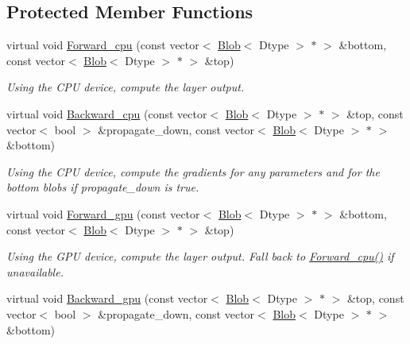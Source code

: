 \subsection*{Protected Member Functions}
\begin{DoxyCompactItemize}
\item 
virtual void \hyperlink{classcaffe_1_1CropLayer_ac04c0c520795b4879018755d26acf7aa}{Forward\+\_\+cpu} (const vector$<$ \hyperlink{classcaffe_1_1Blob}{Blob}$<$ Dtype $>$ $\ast$ $>$ \&bottom, const vector$<$ \hyperlink{classcaffe_1_1Blob}{Blob}$<$ Dtype $>$ $\ast$ $>$ \&top)\hypertarget{classcaffe_1_1CropLayer_ac04c0c520795b4879018755d26acf7aa}{}\label{classcaffe_1_1CropLayer_ac04c0c520795b4879018755d26acf7aa}

\begin{DoxyCompactList}\small\item\em Using the C\+PU device, compute the layer output. \end{DoxyCompactList}\item 
virtual void \hyperlink{classcaffe_1_1CropLayer_abf342bcb5e278303fd0c8e90016c2df2}{Backward\+\_\+cpu} (const vector$<$ \hyperlink{classcaffe_1_1Blob}{Blob}$<$ Dtype $>$ $\ast$ $>$ \&top, const vector$<$ bool $>$ \&propagate\+\_\+down, const vector$<$ \hyperlink{classcaffe_1_1Blob}{Blob}$<$ Dtype $>$ $\ast$ $>$ \&bottom)\hypertarget{classcaffe_1_1CropLayer_abf342bcb5e278303fd0c8e90016c2df2}{}\label{classcaffe_1_1CropLayer_abf342bcb5e278303fd0c8e90016c2df2}

\begin{DoxyCompactList}\small\item\em Using the C\+PU device, compute the gradients for any parameters and for the bottom blobs if propagate\+\_\+down is true. \end{DoxyCompactList}\item 
virtual void \hyperlink{classcaffe_1_1CropLayer_a6eff85d2be46fa1701a17a26c1e54dfb}{Forward\+\_\+gpu} (const vector$<$ \hyperlink{classcaffe_1_1Blob}{Blob}$<$ Dtype $>$ $\ast$ $>$ \&bottom, const vector$<$ \hyperlink{classcaffe_1_1Blob}{Blob}$<$ Dtype $>$ $\ast$ $>$ \&top)\hypertarget{classcaffe_1_1CropLayer_a6eff85d2be46fa1701a17a26c1e54dfb}{}\label{classcaffe_1_1CropLayer_a6eff85d2be46fa1701a17a26c1e54dfb}

\begin{DoxyCompactList}\small\item\em Using the G\+PU device, compute the layer output. Fall back to \hyperlink{classcaffe_1_1CropLayer_ac04c0c520795b4879018755d26acf7aa}{Forward\+\_\+cpu()} if unavailable. \end{DoxyCompactList}\item 
virtual void \hyperlink{classcaffe_1_1CropLayer_a3a7f52f728093a219e2784d9c15be41d}{Backward\+\_\+gpu} (const vector$<$ \hyperlink{classcaffe_1_1Blob}{Blob}$<$ Dtype $>$ $\ast$ $>$ \&top, const vector$<$ bool $>$ \&propagate\+\_\+down, const vector$<$ \hyperlink{classcaffe_1_1Blob}{Blob}$<$ Dtype $>$ $\ast$ $>$ \&bottom)\hypertarget{classcaffe_1_1CropLayer_a3a7f52f728093a219e2784d9c15be41d}{}\label{classcaffe_1_1CropLayer_a3a7f52f728093a219e2784d9c15be41d}


\end{DoxyCompactItemize}
